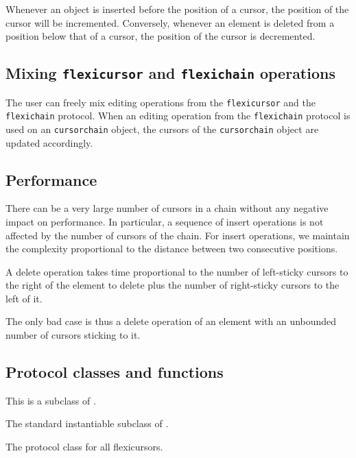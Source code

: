 \documentclass[11pt]{article}
\begin{document}
Whenever an object is inserted before the position of a
cursor, the position of the cursor will be incremented.  Conversely,
whenever an element is deleted from a position below that of a cursor,
the position of the cursor is decremented.

\subsection{Mixing \texttt{flexicursor} and \texttt{flexichain} operations}

The user can freely mix editing operations from the
\texttt{flexicursor} and the \texttt{flexichain} protocol.  When an
editing operation from the \texttt{flexichain} protocol is used on an
\texttt{cursorchain} object, the cursors of the \texttt{cursorchain}
object are updated accordingly.

\subsection{Performance}

There can be a very large number of cursors in a chain without any
negative impact on performance.  In particular, a sequence of insert
operations is not affected by the number of cursors of the chain.
For insert operations, we maintain the complexity proportional to the
distance between two consecutive positions.  

A delete operation takes time proportional to the number of
left-sticky cursors to the right of the element to delete plus the
number of right-sticky cursors to the left of it. 

The only bad case is thus a delete operation of an element with an
unbounded number of cursors sticking to it. 

\subsection{Protocol classes and functions}


This is a subclass of .


The standard instantiable subclass of .


The protocol class for all flexicursors.

\end{document}
